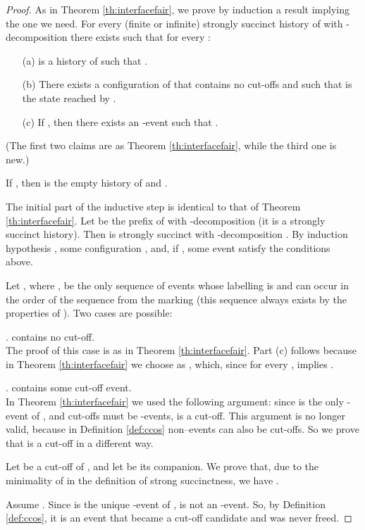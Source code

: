 \documentclass{llncs}
\begin{document}
\begin{proof}
As in Theorem \ref{th:interfacefair}, we prove by induction a result implying the one we need.
For every (finite or infinite) strongly succinct history of  with -decomposition 
there exists  such that for every :
\begin{enumerate}
\item[(a)]  is a history of  such that .
\item[(b)] There exists a configuration  of  that contains no cut-offs and such that
 is the state reached by . 
\item[(c)] If , then there exists an -event  such that . 
\end{enumerate}
\noindent (The first two claims are as Theorem \ref{th:interfacefair}, while the third one is new.)

If , then  is the empty history of  and .

The initial part of the inductive step is identical to that of Theorem \ref{th:interfacefair}. 
Let  be the prefix of  with -decomposition  (it is a strongly succinct history).
Then  is strongly succinct with -decomposition . 
By induction hypothesis , some configuration ,
and, if , some event  satisfy the conditions above. 

Let , where ,  be the only sequence of events 
whose labelling is  and can occur in the order of the sequence from the marking  
(this sequence always exists by the properties of ). 
Two cases are possible:

\vspace{0.1cm}
.  contains no cut-off.\\
The proof of this case is as in Theorem \ref{th:interfacefair}. Part (c) follows because in Theorem \ref{th:interfacefair}
we choose  as , which, since  for every , implies .

\vspace{0.1cm}
.  contains some cut-off event.\\
In Theorem \ref{th:interfacefair} we used the following argument: since  is the only -event of
, and cut-offs must be -events,  is a cut-off. This argument is no longer valid,
because in Definition \ref{def:ccos} non--events can also be cut-offs. So we prove 
that  is a cut-off in a different way.

Let  be a cut-off of , and let  be its companion. 
We prove that, due to the minimality of  in the definition of strong succinctness,
we have .

Assume . Since  is the unique -event of ,
 is not an -event. So, by Definition \ref{def:ccos}, it is an event that became a cut-off candidate
and was never freed. 



\end{proof}
\end{document}
